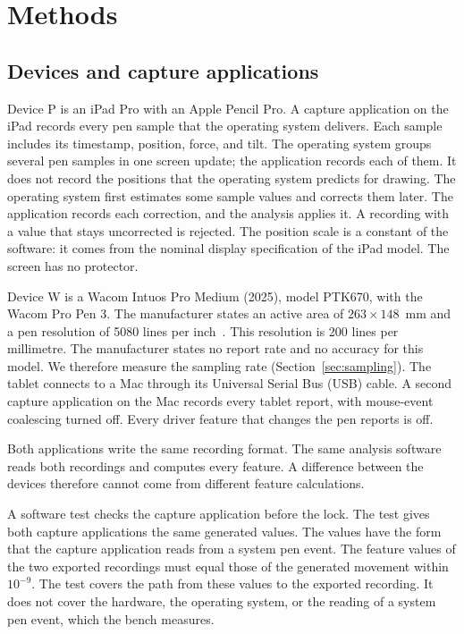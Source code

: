 \section{Methods}
\label{sec:methods}

\subsection{Devices and capture applications}
\label{sec:devices}
Device P is an iPad Pro with an Apple Pencil Pro.
A capture application on the iPad records every pen sample that the operating system delivers.
Each sample includes its timestamp, position, force, and tilt.
The operating system groups several pen samples in one screen update; the application records each of them.
It does not record the positions that the operating system predicts for drawing.
The operating system first estimates some sample values and corrects them later.
The application records each correction, and the analysis applies it.
A recording with a value that stays uncorrected is rejected.
The position scale is a constant of the software: it comes from the nominal display specification of the iPad model.
The screen has no protector.

Device W is a Wacom Intuos Pro Medium (2025), model PTK670, with the Wacom Pro Pen 3.
The manufacturer states an active area of $263\times148$~mm and a pen resolution of 5080 lines per inch~\cite{WacomIntuosPro}.
This resolution is 200 lines per millimetre.
The manufacturer states no report rate and no accuracy for this model.
We therefore measure the sampling rate (Section~\ref{sec:sampling}).
The tablet connects to a Mac through its Universal Serial Bus (USB) cable.
A second capture application on the Mac records every tablet report, with mouse-event coalescing turned off.
Every driver feature that changes the pen reports is off.

Both applications write the same recording format.
The same analysis software reads both recordings and computes every feature.
A difference between the devices therefore cannot come from different feature calculations.

A software test checks the capture application before the lock.
The test gives both capture applications the same generated values.
The values have the form that the capture application reads from a system pen event.
The feature values of the two exported recordings must equal those of the generated movement within $10^{-9}$.
The test covers the path from these values to the exported recording.
It does not cover the hardware, the operating system, or the reading of a system pen event, which the bench measures.

